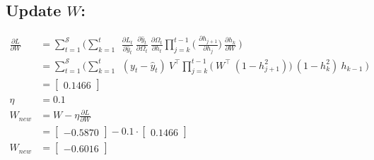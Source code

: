 \documentclass{article}
\begin{document}
\subsection{Update $W$:}
\begin{align*}
    \frac{\partial L}{ \partial{W}} &= \sum_{t=1}^{\mathcal{S}} 
	\bigg(	
	 \sum_{k=1}^{t} ~
	~\frac{\partial L_t}{\partial \hat{y}_t}
        ~\frac{\partial \hat{y}_t}{\partial \Omega_t}
	~\frac{\partial \Omega_t}{\partial h_t}
        \prod_{j=k}^{t-1} \bigg(
	~\frac{\partial h_{j+1}}{\partial h_{j}}
        \bigg)
	~\frac{\partial h_k}{\partial W}~
	\bigg) \\
  &= \sum_{t=1}^{\mathcal{S}} 
	\bigg(	
	 \sum_{k=1}^{t} ~
	~(y_t - \hat{y}_t)
	~V^\top
        \prod_{j=k}^{t-1} \bigg(
	~W^\top ~ (1 - h_{j+1}^2)
        \bigg)
	~(1-h_k^2)~ h_{k-1}~
	\bigg) \\
 &= \begin{bmatrix}
0.1466
\end{bmatrix}\\
\eta &= 0.1\\
W_{new} &= W - \eta \frac{\partial L}{\partial W}\\
&= \begin{bmatrix}
    -0.5870
\end{bmatrix}- 0.1 \cdot \begin{bmatrix}
0.1466
\end{bmatrix}\\
W_{new} &= \begin{bmatrix}
-0.6016
\end{bmatrix}
\end{align*}
\end{document}
